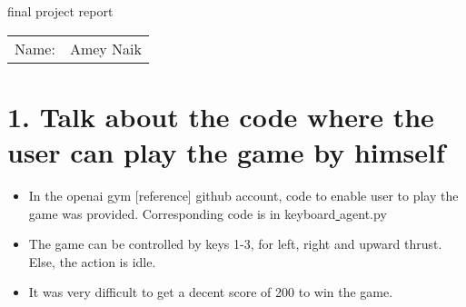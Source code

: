 \documentclass[12pt]{article}
\begin{document}
\begin{center}
{\Large final project report}
   
\begin{tabular}{rl}
Name: & Amey Naik\\ 
\end{tabular}
\end{center}

\renewcommand\thesubsection{\alph{subsection}}
\section*{1. Talk about the code where the user can play the game by himself}
\begin{itemize}
\item In the openai gym [reference] github account, code to enable user to  play the game was provided. Corresponding code is in keyboard\underline{  }agent.py
\item The game can be controlled by keys 1-3, for left, right and upward thrust. Else, the action is idle. 
\item It was very difficult to get a decent score of 200 to win the game. 

\end{itemize}
\end{document}
